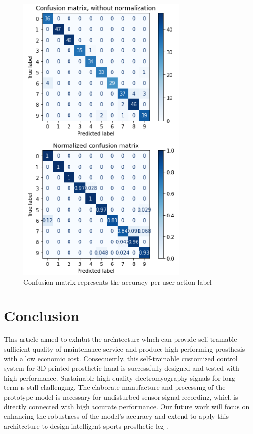 \documentclass[conference]{IEEEtran}
\begin{document}
\begin{figure}[h]
  \centering
  \includegraphics[width=3.3in]{confusionmatrix3.PNG}
  \caption{Confusion matrix represents the accuracy per user action label}
  \label{cm}
\end{figure}



\section{Conclusion}
This article aimed to exhibit the architecture which can provide self trainable sufficient quality of maintenance service and produce high performing prosthesis with a low economic cost. Consequently, this self-trainable customized control system for 3D printed prosthetic hand is successfully designed and tested with high performance. Sustainable high quality electromyography signals for long term is still challenging. The elaborate manufacture and processing of the prototype model is necessary for undisturbed sensor signal recording, which is directly connected with high accurate performance. Our future work will focus on enhancing the robustness of the model's accuracy and extend to apply this architecture to design intelligent sports prosthetic leg \cite{sportsleg}.
\end{document}
